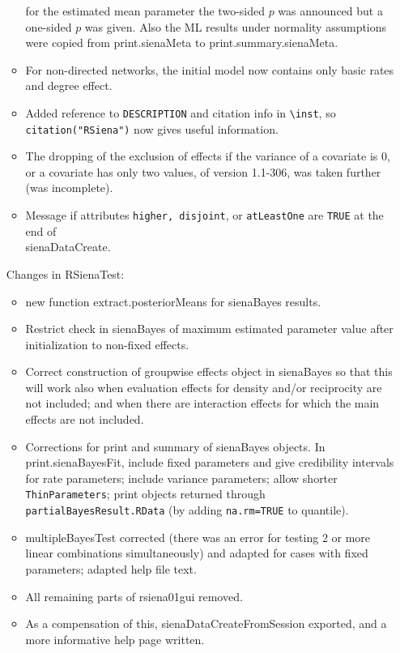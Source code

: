 \documentclass[a4paper,fleqn,11pt]{article}
\newcommand{\+}{\, + \,}
\newcommand{\sfn}[1]{\textsf{#1}}
\begin{document}
\begin{small}
\begin{itemize}
\begin{itemize}
     for the estimated mean parameter the two-sided $p$ was announced but a
     one-sided $p$ was given. Also the ML results under normality assumptions
     were copied from \sfn{print.sienaMeta} to \sfn{print.summary.sienaMeta}.
   \item For non-directed networks, the initial model now contains
    only basic rates and degree effect.
   \item Added reference to \texttt{DESCRIPTION} and citation info in
    \texttt{{\textbackslash}inst},
   so \texttt{citation("RSiena")} now gives useful information.
   \item The dropping of the exclusion of effects if the variance of a
     covariate is 0, or a covariate has only two values, of version 1.1-306,
     was  taken further (was incomplete).
   \item Message if attributes \texttt{higher, disjoint},
   or \texttt{atLeastOne} are \texttt{TRUE}      at the end of \\
     \sfn{sienaDataCreate}.
   \end{itemize}
Changes in RSienaTest:
\begin{itemize}
   \item new function \sfn{extract.posteriorMeans} for \sfn{sienaBayes} results.
   \item Restrict check in \sfn{sienaBayes} of maximum
     estimated parameter value after initialization to non-fixed effects.
   \item Correct construction of groupwise effects object in \sfn{sienaBayes}
    so that this
     will work also when evaluation effects for density and/or reciprocity are
     not included; and when there are interaction effects for which the main
     effects are not included.
   \item Corrections for \sfn{print} and \sfn{summary} of \sfn{sienaBayes} objects.
     In \sfn{print.sienaBayesFit}, include fixed parameters and
     give credibility intervals for rate parameters; include variance parameters;
     allow shorter \texttt{ThinParameters};
     print objects returned through \\
     \texttt{partialBayesResult.RData}
     (by adding \texttt{na.rm=TRUE} to quantile).
   \item \sfn{multipleBayesTest} corrected (there was an error for testing
      2 or more linear combinations simultaneously)
       and adapted for cases with fixed  parameters;
     adapted help file text.
   \item All remaining parts of \sfn{rsiena01gui} removed.
   \item As a compensation of this, \sfn{sienaDataCreateFromSession} exported,
   and a more informative help page written.
\end{itemize}


\end{itemize}
\end{small}
\end{document}
